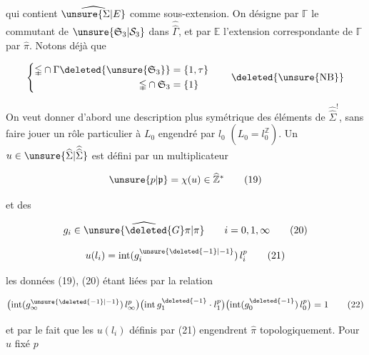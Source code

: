 qui contient $\widehat{\unsure{\Sigma|E}}$ comme sous-extension. On désigne par $\mathbb{\Gamma}$ le commutant de $\unsure{\mathfrak S_3|\mathcal S_3}$ dans $\widehat{\widehat\Gamma}$,  et par $\mathbb E$ l'extension correspondante de $\mathbb{\Gamma}$ par $\widehat\pi$. Notons déjà que

\[
\left\{\begin{aligned}
\mathbb{\Gamma}\cap\Gamma\deleted{\unsure{\mathfrak S_3}}&=\{1,\tau\}\\
\mathbb{\Gamma}\cap\mathfrak S_3&=\{1\}
\end{aligned}\right.\qquad\deleted{\unsure{\mathrm{NB}}}
\]


On veut donner d'abord une description plus symétrique des éléments de $\widehat{\widehat\Sigma}^{!}$, sans faire jouer un rôle particulier à $L_0$ engendré par $l_0$ $(L_0=l_0^{\widehat{\mathbb Z}})$. Un $u\in\unsure{\widehat\Sigma|\widehat{\widehat\Sigma}}$ est  défini par un multiplicateur

\[
\unsure{p|\mathfrak p}=\chi(u)\in\widehat{\mathbb Z}^{*} \tag*{(19)}
\]

et des

\[
g_i\in\widehat{\unsure{\deleted{G}\pi|\pi}}\qquad i=0,1,\infty \tag*{(20)}
\]


\[
u(l_i)=\mathrm{int}(g_i^{\unsure{\deleted{-1}|-1}})\,l_i^p \tag*{(21)}
\]

les données (19), (20) étant liées par la relation

\[
\bigl(\mathrm{int}(g_\infty^{\unsure{\deleted{-1}|-1}})\,l_\infty^p\bigr)
\bigl(\mathrm{int}\,g_1^{\deleted{-1}}\cdot l_1^p\bigr)
\bigl(\mathrm{int}(g_0^{\deleted{-1}})\,l_0^p\bigr)=1 \tag*{(22)}
\]

et par le fait que les $u(l_i)$ définis par (21) engendrent $\widehat\pi$ topologiquement. Pour $u$ fixé\unsure{,} $p$

